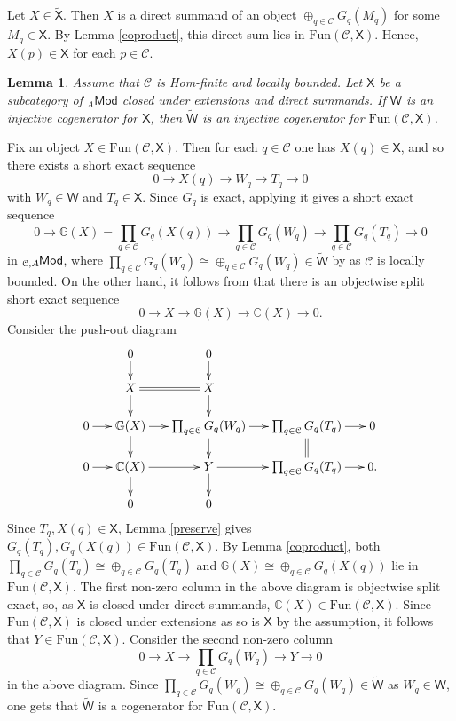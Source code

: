 \documentclass{amsart}
\theoremstyle{bfupright head,slanted body}
\theoremstyle{bfupright head,upright body}
\theoremstyle{fixed bf head,slanted body}
\newtheorem{lem}[res]{Lemma}            \newtheorem*{lem*}{Lemma}
\theoremstyle{fixed bf head,upright body}
\theoremstyle{numbered paragraph}
\newenvironment{prf*}[1][Proof]{%
	\begin{proof}[\bf #1]
		\setcounter{equation}{0}
		\renewcommand{\theequation}{\arabic{equation}}}
	{\end{proof}
}
\numberwithin{equation}{res}
\newcommand{\Mod}[1]{{_{#1}\mathsf{Mod}}}
\newcommand{\Fun}{\mathrm{Fun}}
\newcommand{\X}{\mathsf{X}}
\newcommand{\W}{\mathsf{W}}
\newcommand{\C}{\mathcal{C}}
\newcommand{\is}{\cong}
\newcommand{\lMod}[1]{{}_{#1}\mspace{-1mu}{\sf{Mod}}}
\begin{document}
\begin{prf*}
Let $X\in\widetilde{\X}$. Then $X$ is a direct summand of an object $\oplus_{q\in\C}G_q(M_q)$ for some $M_q\in\X$. By Lemma \ref{coproduct}, this direct sum lies in $\Fun(\C,\X)$. Hence, $X(p)\in\X$ for each $p\in\C$.
\end{prf*}

\begin{lem}\label{cogenerator}
Assume that $\C$ is Hom-finite and locally bounded. Let $\X$ be a subcategory of $\Mod{A}$ closed under extensions and direct summands. If $\W$ is an injective cogenerator for $\X$, then $\widetilde{\W}$ is an injective cogenerator for $\Fun(\C,\X)$.
\end{lem}

\begin{prf*}
Fix an object $X\in \Fun(\C,\X)$. Then for each $q\in\C$ one has $X(q)\in\X$, and so there exists a short exact sequence
\[
0\to X(q)\to W_q \to T_q \to 0
\]
with $W_q\in\W$ and $T_q\in\X$. Since $G_q$ is exact, applying it gives a short exact sequence
\[
0\to \mathbb{G}(X)=\prod_{q\in\C} G_q(X(q))\to \prod_{q\in\C} G_q(W_q) \to \prod_{q\in\C} G_q(T_q) \to 0
\]
in $\lMod{\C,A}$, where $\prod_{q\in\C} G_q(W_q)\is\oplus_{q\in\C} G_q(W_q)\in\widetilde{\W}$ by \cite[Proposition 3.7]{HJ23} as $\C$ is locally bounded. On the other hand, it follows from \cite[Proposition 5.7]{HJ23} that there is an objectwise split short exact sequence
\[0 \to X \to \mathbb{G}(X) \to \mathbb{C}(X) \to 0.\]
Consider the push-out diagram
$$\xymatrix@C=15pt@R=15pt{&0\ar[d] &0\ar[d]\\
  & X \ar@{=}[r]\ar[d] & X \ar[d]\\
  0 \ar[r] & \mathbb{G}(X) \ar[r]\ar[d] & \prod_{q\in\C}G_q(W_q) \ar[r]\ar[d] & \prod_{q\in\C} G_q(T_q) \ar[r]\ar@{=}[d] & 0\\
  0 \ar[r] & \mathbb{C}(X) \ar[r]\ar[d] & Y \ar[r]\ar[d] & \prod_{q\in\C} G_q(T_q) \ar[r] & 0.\\
  & 0 & 0 }$$
Since $T_q, X(q) \in \X$, Lemma \ref{preserve} gives
$G_q(T_q), G_q(X(q))\in\Fun(\C,\X)$. By Lemma \ref{coproduct}, both $\prod_{q\in\C} G_q(T_q)\is\oplus_{q\in\C} G_q(T_q)$ and $\mathbb{G}(X)\is\oplus_{q\in\C} G_q(X(q))$ lie in $\Fun(\C,\X)$.
The first non-zero column in the above diagram is objectwise split exact, so, as $\X$ is closed under direct summands, $\mathbb{C}(X)\in\Fun(\C,\X)$.
Since $\Fun(\C,\X)$ is closed under extensions as so is $\X$ by the assumption, it follows that $Y\in\Fun(\C,\X)$. Consider the second non-zero column
\[0 \to X \to \prod_{q\in\C}G_q(W_q) \to Y \to 0\]
in the above diagram. Since $\prod_{q\in\C}G_q(W_q)\is \oplus_{q\in\C}G_q(W_q)\in \widetilde{\W}$ as $W_q\in\W$, one gets that $\widetilde{\W}$ is a cogenerator for $\Fun(\C,\X)$.


\end{prf*}
\end{document}
